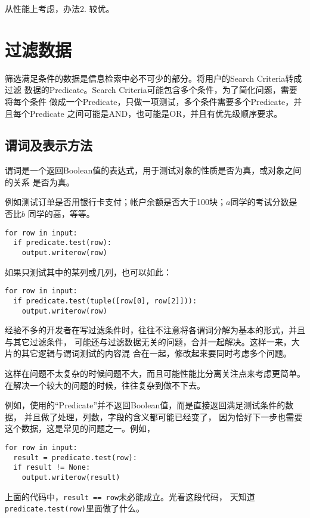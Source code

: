 \documentclass[11pt]{article}
\newcommand{\id}[1]{\texttt{#1}}
\begin{document}
从性能上考虑，办法2. 较优。

\section{过滤数据} \label{sec-filtering}
筛选满足条件的数据是信息检索中必不可少的部分。将用户的Search Criteria转成过滤
数据的Predicate。Search Criteria可能包含多个条件，为了简化问题，需要将每个条件
做成一个Predicate，只做一项测试，多个条件需要多个Predicate，并且每个Predicate
之间可能是AND，也可能是OR，并且有优先级顺序要求。

\subsection{谓词及表示方法}
谓词是一个返回Boolean值的表达式，用于测试对象的性质是否为真，或对象之间的关系
是否为真。

例如测试订单是否用银行卡支付；帐户余额是否大于100块；$a$同学的考试分数是否比$b$
同学的高，等等。
\begin{lstlisting}
for row in input:
  if predicate.test(row):
    output.writerow(row)
\end{lstlisting}
如果只测试其中的某列或几列，也可以如此：
\begin{lstlisting}
for row in input:
  if predicate.test(tuple([row[0], row[2]])):
    output.writerow(row)
\end{lstlisting}

经验不多的开发者在写过滤条件时，往往不注意将各谓词分解为基本的形式，并且与其它过滤条件，
可能还与过滤数据无关的问题，合并一起解决。这样一来，大片的其它逻辑与谓词测试的内容混
合在一起，修改起来要同时考虑多个问题。

这样在问题不太复杂的时候问题不大，而且可能性能比分离关注点来考虑更简单。
在解决一个较大的问题的时候，往往复杂到做不下去。

例如，使用的“Predicate”并不返回Boolean值，而是直接返回满足测试条件的数据，
并且做了处理，列数，字段的含义都可能已经变了，
因为恰好下一步也需要这个数据，这是常见的问题之一。例如，
\begin{lstlisting}
for row in input:
  result = predicate.test(row):
  if result != None:
    output.writerow(result)
\end{lstlisting}
上面的代码中，\id{result == row}未必能成立。光看这段代码，
天知道\id{predicate.test(row)}里面做了什么。
\end{document}

